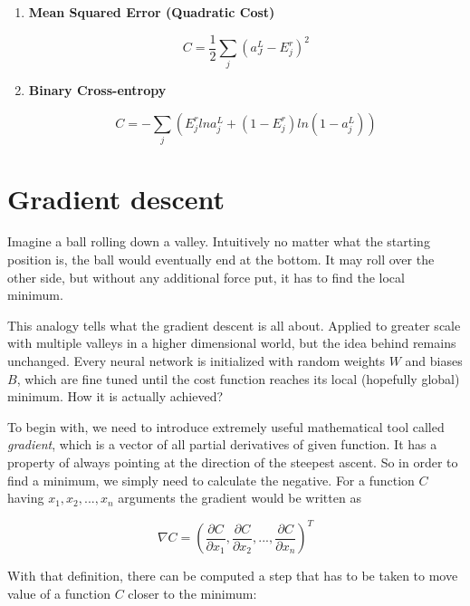 \begin{enumerate}
    \item \textbf{Mean Squared Error (Quadratic Cost)}
    
    \begin{equation}
        C = \frac{1}{2}\sum_j (a^L_J - E^r_j)^2
    \end{equation}
    
    \item \textbf{Binary Cross-entropy}
    
    \begin{equation}
        C = -\sum_j\left(E_j^rlna_j^L + (1-E_j^r) ln(1 - a_j^L)\right)
    \end{equation}
    
\end{enumerate}

\section{Gradient descent}
\label{sec:gradient-descent}

Imagine a ball rolling down a valley. Intuitively no matter what the starting position is, the ball would eventually end at the bottom. It may roll over the other side, but without any additional force put, it has to find the local minimum. 

This analogy tells what the gradient descent is all about. Applied to greater scale with multiple valleys in a higher dimensional world, but the idea behind remains unchanged. Every neural network is initialized with random weights $W$ and biases $B$, which are fine tuned until the cost function reaches its local (hopefully global) minimum. How it is actually achieved?

To begin with, we need to introduce extremely useful mathematical tool called \emph{gradient}, which is a vector of all partial derivatives of given function. It has a property of always pointing at the direction of the steepest ascent. So in order to find a minimum, we simply need to calculate the negative. For a function $C$ having $x_1, x_2, ..., x_n$ arguments the gradient would be written as 

\begin{equation}
\nabla C = \left(\frac{\partial C}{\partial x_1}, \frac{\partial C}{\partial x_2}, ..., \frac{\partial C}{\partial x_n}\right)^T
\end{equation}

With that definition, there can be computed a step that has to be taken to move value of a function $C$ closer to the minimum:

